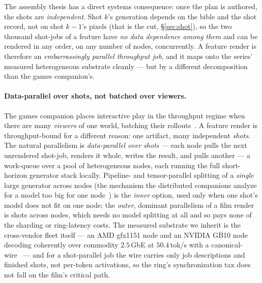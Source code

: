 \documentclass[11pt]{article}
\begin{document}
The assembly thesis has a direct systems consequence: once the plan is authored, the shots are \emph{independent}.
Shot $k$'s generation depends on the bible and the shot record, not on shot $k{-}1$'s pixels (that is the cut,
\S\ref{sec:shot}), so the two thousand shot-jobs of a feature have \emph{no data dependence among them} and can
be rendered in any order, on any number of nodes, concurrently. A feature render is therefore an
\emph{embarrassingly parallel throughput job}, and it maps onto the series' measured heterogeneous substrate
cleanly --- but by a different decomposition than the games companion's.

\paragraph{Data-parallel over shots, not batched over viewers.} The games companion places interactive play in
the throughput regime when there are many \emph{viewers} of one world, batching their rollouts~\cite{games}. A
feature render is throughput-bound for a different reason: one artifact, many independent \emph{shots}. The
natural parallelism is \emph{data-parallel over shots} --- each node pulls the next unrendered shot-job, renders
it whole, writes the result, and pulls another --- a work-queue over a pool of heterogeneous nodes, each running
the full short-horizon generator stack locally. Pipeline- and tensor-parallel splitting of a \emph{single} large
generator across nodes (the mechanism the distributed companions analyze for a model too big for one
node~\cite{het,latency}) is the \emph{inner} option, used only when one shot's model does not fit on one node;
the \emph{outer}, dominant parallelism of a film render is shots across nodes, which needs no model splitting at
all and so pays none of the sharding or ring-latency costs. The measured substrate we inherit is the
cross-vendor fleet itself --- an AMD gfx1151 node and an NVIDIA GB10 node decoding coherently over commodity
$2.5$\,GbE at $50.4$\,tok/s with a canonical- wire~\cite{het} --- and for a shot-parallel job the wire
carries only job descriptions and finished shots, not per-token activations, so the ring's synchronization tax
does not fall on the film's critical path.
\end{document}
